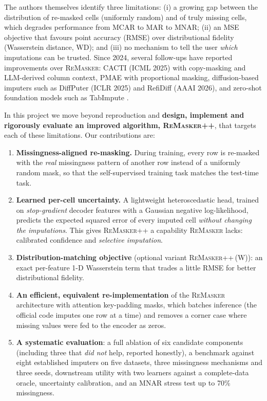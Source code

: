 \documentclass[11pt]{article}
\newcommand{\rmpp}{\textsc{ReMasker++}}
\newcommand{\remasker}{\textsc{ReMasker}}
\begin{document}
The authors themselves identify three limitations: (i) a growing gap between the distribution of re-masked cells (uniformly random) and of truly missing cells, which degrades performance from MCAR to MAR to MNAR; (ii) an MSE objective that favours point accuracy (RMSE) over distributional fidelity (Wasserstein distance, WD); and (iii) no mechanism to tell the user \emph{which} imputations can be trusted. Since 2024, several follow-ups have reported improvements over \remasker{}: CACTI \citep{cacti} (ICML 2025) with copy-masking and LLM-derived column context, PMAE \citep{pmae} with proportional masking, diffusion-based imputers such as DiffPuter \citep{diffputer} (ICLR 2025) and RefiDiff (AAAI 2026), and zero-shot foundation models such as TabImpute \citep{tabimpute}.

In this project we move beyond reproduction and \textbf{design, implement and rigorously evaluate an improved algorithm, \rmpp}, that targets each of these limitations. Our contributions are:
\begin{enumerate}
\item \textbf{Missingness-aligned re-masking.} During training, every row is re-masked with the \emph{real} missingness pattern of another row instead of a uniformly random mask, so that the self-supervised training task matches the test-time task.
\item \textbf{Learned per-cell uncertainty.} A lightweight heteroscedastic head, trained on \emph{stop-gradient} decoder features with a Gaussian negative log-likelihood, predicts the expected squared error of every imputed cell \emph{without changing the imputations}. This gives \rmpp{} a capability \remasker{} lacks: calibrated confidence and \emph{selective imputation}.
\item \textbf{Distribution-matching objective} (optional variant \rmpp{}\,(W)): an exact per-feature 1-D Wasserstein term that trades a little RMSE for better distributional fidelity.
\item \textbf{An efficient, equivalent re-implementation} of the \remasker{} architecture with attention key-padding masks, which batches inference (the official code imputes one row at a time) and removes a corner case where missing values were fed to the encoder as zeros.
\item \textbf{A systematic evaluation}: a full ablation of six candidate components (including three that \emph{did not} help, reported honestly), a benchmark against eight established imputers on five datasets, three missingness mechanisms and three seeds, downstream utility with two learners against a complete-data oracle, uncertainty calibration, and an MNAR stress test up to 70\% missingness.
\end{enumerate}
\end{document}
